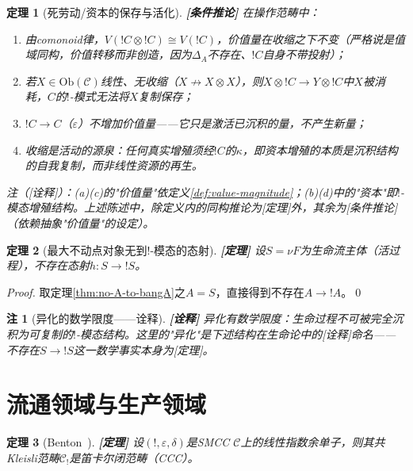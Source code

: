 \documentclass[11pt,a4paper]{article}
\newtheorem{theorem}{定理}
\newtheorem{remark}{注}
\newcommand{\lvl}[1]{\hfill\textbf{\footnotesize[#1]}}
\newcommand{\lvP}{\lvl{定理}}
\newcommand{\lvC}{\lvl{条件推论}}
\newcommand{\lvI}{\lvl{诠释}}
\newcommand{\cat}[1]{\mathcal{#1}}
\newcommand{\C}{\cat{C}}
\newcommand{\bang}{{!}}
\newcommand{\tensor}{\otimes}
\newcommand{\coKl}[1]{\C_{\bang}}
\newcommand{\eps}{\varepsilon}
\newcommand{\mN}{\nu}
\begin{document}
\begin{theorem}[死劳动/资本的保存与活化]\label{thm:surplus-linear}\lvC
在操作范畴中：
\begin{enumerate}
  \item[(a)] 由comonoid律，$V(\bang C\tensor\bang C)\cong V(\bang C)$，价值量在收缩之下不变（严格说是值域同构，价值转移而非创造，因为$\Delta_A$不存在、$\bang C$自身不带投射）；
  \item[(b)] 若$X\in\mathrm{Ob}(\C)$线性、无收缩（$X\nrightarrow X\tensor X$），则$X\tensor\bang C\to Y\tensor\bang C$中$X$被消耗，$C$的$\bang$-模式无法将$X$复制保存；
  \item[(c)] $\bang C\to C$（$\eps$）不增加价值量——它只是激活已沉积的量，不产生新量；
  \item[(d)] 收缩是活动的源泉：任何真实增殖须经$\bang C$的$\kappa$，即资本增殖的本质是沉积结构的自我复制，而非线性资源的再生。
\end{enumerate}
注（[诠释]）：(a)(c)的"价值量"依定义\ref{def:value-magnitude}；(b)(d)中的"资本"即$\bang$-模态增殖结构。上述陈述中，除定义内的同构推论为[定理]外，其余为[条件推论]（依赖抽象"价值量"的设定）。
\end{theorem}

\begin{theorem}[最大不动点对象无到!-模态的态射]\label{thm:life-not-capital}\lvP
设$S=\mN F$为生命流主体（活过程），不存在态射$h:S\to\bang S$。
\end{theorem}

\begin{proof}
取定理\ref{thm:no-A-to-bangA}之$A=S$，直接得到不存在$A\to\bang A$。\qed
\end{proof}

\begin{remark}[异化的数学限度——诠释]\lvI
异化有数学限度：生命过程不可被完全沉积为可复制的$\bang$-模态结构。这里的"异化"是下述结构在生命论中的[诠释]命名——不存在$S\to\bang S$这一数学事实本身为[定理]。
\end{remark}

\section{流通领域与生产领域}

\begin{theorem}[Benton~\cite{benton95}]\label{thm:cokleisli-ccc}\lvP
设$(\bang,\eps,\delta)$是SMCC $\C$上的线性指数余单子，则其共Kleisli范畴$\coKl{!}$是笛卡尔闭范畴（CCC）。
\end{theorem}
\end{document}
